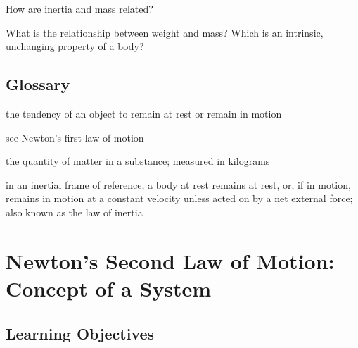 \documentclass[
]{book}
\providecommand{\tightlist}{%
  \setlength{\itemsep}{0pt}\setlength{\parskip}{0pt}}
\begin{document}
\hypertarget{fs-id1263177}{}
\leavevmode{}%
How are inertia and mass related?

\hypertarget{fs-id1561865}{}
\leavevmode{}%
What is the relationship between weight and mass? Which is an intrinsic,
unchanging property of a body?

\hypertarget{glossary-12}{%
\subsection{Glossary}\label{glossary-12}}

\begin{description}
\tightlist
\item[inertia]
the tendency of an object to remain at rest or remain in motion
\end{description}

\begin{description}
\tightlist
\item[law of inertia]
see Newton's first law of motion
\end{description}

\begin{description}
\tightlist
\item[mass]
the quantity of matter in a substance; measured in kilograms
\end{description}

\begin{description}
\tightlist
\item[Newton's first law of motion]
in an inertial frame of reference, a body at rest remains at rest,
or, if in motion, remains in motion at a constant velocity unless
acted on by a net external force; also known as the law of inertia
\end{description}

\hypertarget{newtons-second-law-of-motion-concept-of-a-system}{%
\section{Newton's Second Law of Motion: Concept of a System}\label{newtons-second-law-of-motion-concept-of-a-system}}

\hypertarget{fs-id1899128}{}
\hypertarget{learning-objectives-14}{%
\subsection{Learning Objectives}\label{learning-objectives-14}}
\end{document}
